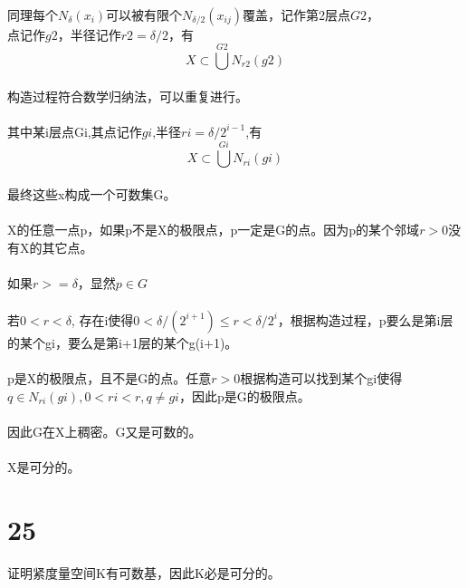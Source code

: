\paragraph{} 同理每个$N_{\delta}(x_i)$可以被有限个$N_{\delta / 2}(x_{ij})$覆盖，记作第2层点$G2$，\\点记作$g2$，半径记作$r2=\delta/2$，有$$ X \subset \bigcup^{G2}N_{r2}(g2) $$
\paragraph{} 构造过程符合数学归纳法，可以重复进行。
\paragraph{} 其中某i层点Gi,其点记作$gi$,半径$ri=\delta/2^{i-1}$,有$$ X \subset \bigcup^{Gi}N_{ri}(gi) $$
\paragraph{} 最终这些x构成一个可数集G。
\paragraph{} X的任意一点p，如果p不是X的极限点，p一定是G的点。因为p的某个邻域$r> 0$没有X的其它点。
\paragraph{} 如果$r >= \delta$，显然$p \in G$
\paragraph{} 若$ 0 < r < \delta$, 存在i使得$0 < \delta/(2^{i+1}) \le r < \delta/2^{i} $，根据构造过程，p要么是第i层的某个gi，要么是第i+1层的某个g(i+1)。
\paragraph{} p是X的极限点，且不是G的点。任意$r>0$根据构造可以找到某个gi使得$q \in N_{ri}(gi), 0 < ri < r, q \ne gi$，因此p是G的极限点。
\paragraph{} 因此G在X上稠密。G又是可数的。
\paragraph{} X是可分的。
\section*{25} 证明紧度量空间K有可数基，因此K必是可分的。
